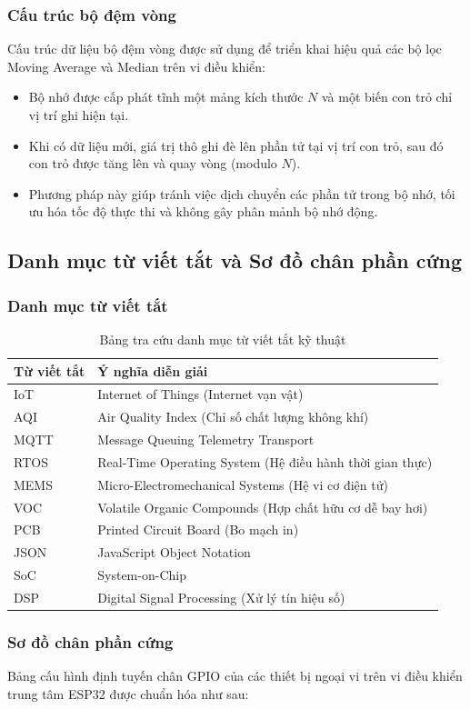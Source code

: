 \documentclass[12pt,a4paper]{article}
\begin{document}
\subsubsection{Cấu trúc bộ đệm vòng}
Cấu trúc dữ liệu bộ đệm vòng được sử dụng để triển khai hiệu quả các bộ lọc Moving Average và Median trên vi điều khiển:
\begin{itemize}
    \item Bộ nhớ được cấp phát tĩnh một mảng kích thước $N$ và một biến con trỏ chỉ vị trí ghi hiện tại.
    \item Khi có dữ liệu mới, giá trị thô ghi đè lên phần tử tại vị trí con trỏ, sau đó con trỏ được tăng lên và quay vòng (modulo $N$).
    \item Phương pháp này giúp tránh việc dịch chuyển các phần tử trong bộ nhớ, tối ưu hóa tốc độ thực thi và không gây phân mảnh bộ nhớ động.
\end{itemize}


\subsection{Danh mục từ viết tắt và Sơ đồ chân phần cứng}

\subsubsection{Danh mục từ viết tắt}
\begin{table}[H]
    \centering
    \caption{Bảng tra cứu danh mục từ viết tắt kỹ thuật}
    \label{tab:abbrev}
\begin{tabular}{|l|l|}
\hline
\textbf{Từ viết tắt} & \textbf{Ý nghĩa diễn giải} \\ 
\hline
IoT   & Internet of Things (Internet vạn vật) \\ 
\hline
AQI   & Air Quality Index (Chỉ số chất lượng không khí) \\ 
\hline
MQTT  & Message Queuing Telemetry Transport \\ 
\hline
RTOS  & Real-Time Operating System (Hệ điều hành thời gian thực) \\ 
\hline
MEMS  & Micro-Electromechanical Systems (Hệ vi cơ điện tử) \\ 
\hline
VOC   & Volatile Organic Compounds (Hợp chất hữu cơ dễ bay hơi) \\ 
\hline
PCB   & Printed Circuit Board (Bo mạch in) \\ 
\hline
JSON  & JavaScript Object Notation \\ 
\hline
SoC   & System-on-Chip \\ 
\hline
DSP   & Digital Signal Processing (Xử lý tín hiệu số) \\ 
\hline
\end{tabular}
    
\end{table}

\subsubsection{Sơ đồ chân phần cứng}
Bảng cấu hình định tuyến chân GPIO của các thiết bị ngoại vi trên vi điều khiển trung tâm ESP32 được chuẩn hóa như sau:
\end{document}
